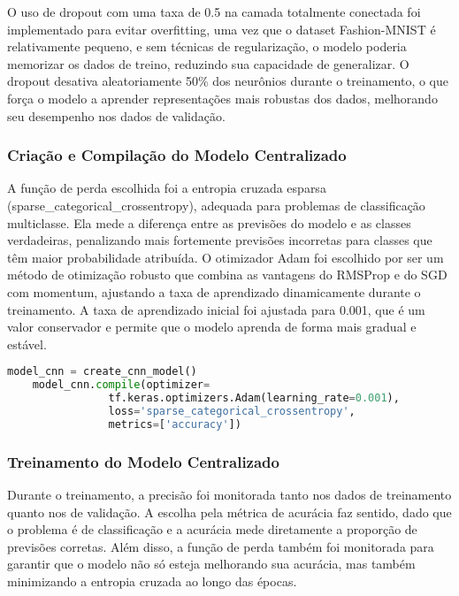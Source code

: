 O uso de dropout com uma taxa de 0.5 na camada totalmente conectada foi implementado para evitar overfitting, uma vez que o dataset Fashion-MNIST é relativamente pequeno, e sem técnicas de regularização, o modelo poderia memorizar os dados de treino, reduzindo sua capacidade de generalizar. O dropout desativa aleatoriamente 50\% dos neurônios durante o treinamento, o que força o modelo a aprender representações mais robustas dos dados, melhorando seu desempenho nos dados de validação.

\subsubsection{Criação e Compilação do Modelo Centralizado}

A função de perda escolhida foi a entropia cruzada esparsa (sparse\_categorical\_crossentropy), adequada para problemas de classificação multiclasse. Ela mede a diferença entre as previsões do modelo e as classes verdadeiras, penalizando mais fortemente previsões incorretas para classes que têm maior probabilidade atribuída. O otimizador Adam foi escolhido por ser um método de otimização robusto que combina as vantagens do RMSProp e do SGD com momentum, ajustando a taxa de aprendizado dinamicamente durante o treinamento. A taxa de aprendizado inicial foi ajustada para 0.001, que é um valor conservador e permite que o modelo aprenda de forma mais gradual e estável.

\begin{lstlisting}[language=Python, caption={Criação e compilação do modelo centralizado}, label={lst:centralized_model}]
    model_cnn = create_cnn_model()
    model_cnn.compile(optimizer=
                tf.keras.optimizers.Adam(learning_rate=0.001),
                loss='sparse_categorical_crossentropy',
                metrics=['accuracy'])
\end{lstlisting}

\subsubsection{Treinamento do Modelo Centralizado}

Durante o treinamento, a precisão foi monitorada tanto nos dados de treinamento quanto nos de validação. A escolha pela métrica de acurácia faz sentido, dado que o problema é de classificação e a acurácia mede diretamente a proporção de previsões corretas. Além disso, a função de perda também foi monitorada para garantir que o modelo não só esteja melhorando sua acurácia, mas também minimizando a entropia cruzada ao longo das épocas.

